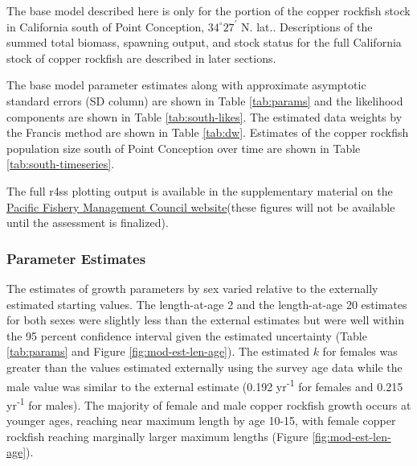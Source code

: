 \documentclass[11pt,
  english,
  letterpaper,
]{article}
\begin{document}
The base model described here is only for the portion of the copper rockfish stock in California south of Point Conception, $34^\circ 27^\prime$ N. lat.. Descriptions of the summed total biomass, spawning output, and stock status for the full California stock of copper rockfish are described in later sections.

The base model parameter estimates along with approximate asymptotic standard errors (SD column) are shown in Table \ref{tab:params} and the likelihood components are shown in Table \ref{tab:south-likes}. The estimated data weights by the Francis method are shown in Table \ref{tab:dw}. Estimates of the copper rockfish population size south of Point Conception over time are shown in Table \ref{tab:south-timeseries}.

The full r4ss plotting output is available in the supplementary material on the \href{pcouncil.org}{Pacific Fishery Management Council website}(these figures will not be available until the assessment is finalized).

\hypertarget{parameter-estimates}{%
\subsubsection{Parameter Estimates}\label{parameter-estimates}}

The estimates of growth parameters by sex varied relative to the externally estimated starting values. The length-at-age 2 and the length-at-age 20 estimates for both sexes were slightly less than the external estimates but were well within the 95 percent confidence interval given the estimated uncertainty (Table \ref{tab:params} and Figure \ref{fig:mod-est-len-age}). The estimated \(k\) for females was greater than the values estimated externally using the survey age data while the male value was similar to the external estimate (0.192 yr\textsuperscript{-1} for females and 0.215 yr\textsuperscript{-1} for males). The majority of female and male copper rockfish growth occurs at younger ages, reaching near maximum length by age 10-15, with female copper rockfish reaching marginally larger maximum lengths (Figure \ref{fig:mod-est-len-age}).
\end{document}
